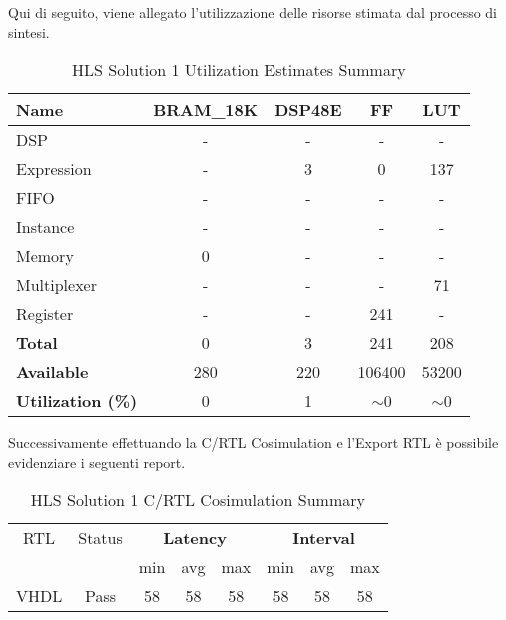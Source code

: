 Qui di seguito, viene allegato l'utilizzazione delle risorse stimata dal processo di sintesi.
\begin{table}[h]
	\centering
	\begin{tabular}{|l|c|c|c|c|}
		\hline
		\textbf{Name}    & \textbf{BRAM\_18K} & \textbf{DSP48E} & \textbf{FF} & \textbf{LUT} \\ \hline
		DSP              & -                   & -               & -           & -            \\ 
		Expression       & -                   & 3               & 0           & 137          \\ 
		FIFO             & -                   & -               & -           & -            \\ 
		Instance         & -                   & -               & -           & -            \\ 
		Memory           & 0                   & -               & -          & -            \\ 
		Multiplexer      & -                   & -               & -           & 71          \\ 
		Register         & -                   & -               & 241         & -            \\ \hline
		\textbf{Total}   & 0                   & 3               & 241         & 208          \\ \hline
		\textbf{Available} & 280               & 220             & 106400      & 53200        \\ \hline
		\textbf{Utilization (\%)} & 0            & 1               & $\sim$0     & $\sim$0      \\ \hline
	\end{tabular}
	\caption{HLS Solution 1 Utilization Estimates Summary}
	\label{tab:hls-solution-1-utilization-estimates-summary}
\end{table}

Successivamente effettuando la C/RTL Cosimulation e l'Export RTL è possibile evidenziare i seguenti report.
\begin{table}[H]
	\centering
	\begin{tabular}{|c|c|c|c|c|c|c|c|}
		\hline
		\multicolumn{1}{|c|}{RTL} & \multicolumn{1}{|c|}{Status} & \multicolumn{3}{c|}{\textbf{Latency}} & \multicolumn{3}{c|}{\textbf{Interval}} \\
		&  & min & avg & max & min & avg & max \\
		\hline
		VHDL & Pass & 58 & 58 & 58 & 58 & 58 & 58 \\
		\hline
	\end{tabular}
	\caption{HLS Solution 1 C/RTL Cosimulation Summary }
	\label{tab:hls-solution-1-cosimulation-summary}
\end{table}

